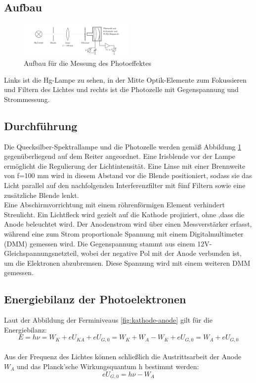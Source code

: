 \documentclass[ngerman]{scrartcl}
\begin{document}
\subsection{Aufbau}
\begin{figure}[htbp]
    \centering
    \includegraphics[width=0.5\textwidth]{figs/Aufbau_plank_wirkungsquantum.png}
    \caption{Aufbau für die Messung des Photoeffektes  \cite{praktikum}}
    \label{fig:aufbau teil 1}
\end{figure}
\FloatBarrier
Links ist die Hg-Lampe zu sehen, in der
Mitte Optik-Elemente zum Fokussieren und Filtern des Lichtes und rechts ist die Photozelle
mit Gegenspannung und Strommessung.

\subsection{Durchführung}
Die Quecksilber-Spektrallampe und die Photozelle werden gemäß Abbildung \ref{fig:aufbau teil 1} gegenüberliegend auf dem Reiter angeordnet. Eine Irisblende vor der Lampe ermöglicht die Regulierung der Lichtintensität. Eine Linse mit einer Brennweite von f=100 mm wird in diesem Abstand vor die Blende positioniert, sodass sie das Licht parallel auf den nachfolgenden Interferenzfilter mit fünf Filtern sowie eine zusätzliche Blende lenkt.\\
Eine Abschirmvorrichtung mit einem röhrenförmigen Element verhindert Streulicht. Ein Lichtfleck wird gezielt auf die Kathode projiziert, ohne ,dass die Anode beleuchtet wird. Der Anodenstrom wird über einen Messverstärker erfasst, während eine zum Strom proportionale Spannung mit einem Digitalmultimeter (DMM) gemessen wird. Die Gegenspannung stammt aus einem 12V-Gleichspannungsnetzteil, wobei der negative Pol mit der Anode verbunden ist, um die Elektronen abzubremsen. Diese Spannung wird mit einem weiteren DMM gemessen.
\subsection{Energiebilanz der Photoelektronen}
Laut der Abbildung der Ferminiveaus \ref{fig:kathode-anode} gilt für die Energiebilanz:
\begin{equation}
    E = h\nu = W_K + eU_{KA} + eU_{G,0} 
    = W_K + W_A - W_K + eU_{G,0} 
    = W_A + eU_{G,0}
\end{equation}\\
Aus der Frequenz des Lichtes können schließlich
die Austrittsarbeit der Anode $W_A$ und das Planck’sche Wirkungsquantum h bestimmt werden:
\begin{equation}
    eU_{G,0} = h\nu - W_A
\end{equation}
\end{document}
